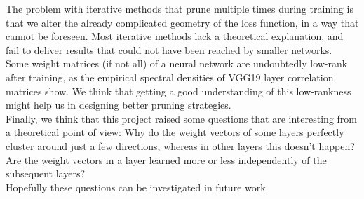 The problem with iterative methods that prune multiple times during training is that we alter the already complicated geometry of the loss function, in a way that cannot be foreseen. Most iterative methods lack a theoretical explanation, and fail to deliver results that could not have been reached by smaller networks. \\ 

Some weight matrices (if not all) of a neural network are undoubtedly low-rank after training, as the empirical spectral densities of VGG19 layer correlation matrices show. We think that getting a good understanding of this low-rankness might help us in designing better pruning strategies. \\

Finally, we think that this project raised some questions that are interesting from a theoretical point of view: Why do the weight vectors of some layers perfectly cluster around just a few directions, whereas in other layers this doesn't happen? Are the weight vectors in a layer learned more or less independently of the subsequent layers? \\

Hopefully these questions can be investigated in future work.

\nocite{*}
\printbibliography



